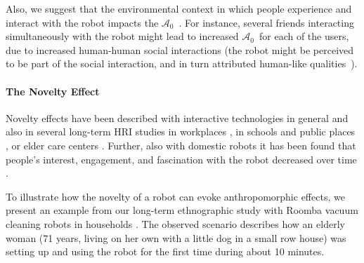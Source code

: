 \documentclass{frontiersSCNS} %
\newcommand{\ICA}{{$\mathcal{A}_0$~}}
\begin{document}
 Also, we suggest that
the environmental context in which people experience and interact with the robot
impacts the \ICA. For instance, several friends interacting simultaneously with
the robot might lead to increased \ICA for each of the users, due to increased
human-human social interactions (the robot might be perceived to be part of the
social interaction, and in turn attributed human-like
qualities~\citep{baxter2013do}).


\paragraph{The Novelty Effect\\}
\label{sec:noveltyeffect}

Novelty effects have been described with interactive technologies in general \citep{rogers_diffusion_1995} and also in several long-term HRI studies in workplaces \citep{huttenrauch_fetch-and-carry_2003,mutlu_robots_2008}, in schools and public places \citep{gockley_designing_2005,kanda_interactive_2004,kanda_communication_2005}, or elder care centers \citep{sabelli_conversational_2011}. Further, also with domestic robots it has been found that people's interest, engagement, and fascination with the robot decreased over time \citep{fink_living_2013,fernaeus_how_2010,sung_robots_2009}.

To illustrate how the novelty of a robot can evoke anthropomorphic effects, we
present an example from our long-term ethnographic study with Roomba vacuum
cleaning robots in households \citep{fink_living_2013}. The observed scenario describes how an elderly
woman (71 years, living on her own with a little dog in a small row house) was
setting up and using the robot for the first time during about 10 minutes.
\end{document}
